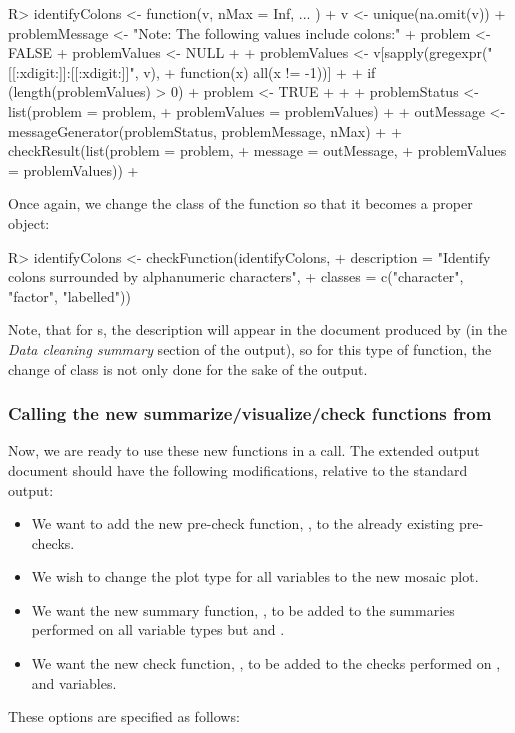 \documentclass[article,shortnames]{jss}
\begin{document}
\begin{Schunk}
\begin{Sinput}
R> identifyColons <- function(v, nMax = Inf, ... ) {
+    v <- unique(na.omit(v))
+    problemMessage <- "Note: The following values include colons:"
+    problem <- FALSE
+    problemValues <- NULL
+  
+    problemValues <- v[sapply(gregexpr("[[:xdigit:]]:[[:xdigit:]]", v),
+      function(x) all(x != -1))]
+  
+    if (length(problemValues) > 0) {
+      problem <- TRUE
+    }
+  
+    problemStatus <- list(problem = problem,
+      problemValues = problemValues)
+  
+    outMessage <- messageGenerator(problemStatus, problemMessage, nMax)
+  
+    checkResult(list(problem = problem,
+      message = outMessage,
+      problemValues = problemValues))
+  }
\end{Sinput}
\end{Schunk}

Once again, we change the class of the function so that it becomes a
proper  object:

\begin{Schunk}
\begin{Sinput}
R> identifyColons <- checkFunction(identifyColons,
+    description = "Identify colons surrounded by alphanumeric characters",
+    classes = c("character", "factor", "labelled"))
\end{Sinput}
\end{Schunk}

Note, that for s, the description will appear in
the document produced by  (in the \textit{Data cleaning
  summary} section of the output), so for this type of function, the
change of class is not only done for the sake of the
 output.

\subsubsection[Calling the new summarize/visualize/check functions from clean()]{Calling the new summarize/visualize/check functions from }
Now, we are ready to use these new functions in a 
call. The extended  output document should have the
following modifications, relative to the standard  output:
\begin{itemize}
\item We want to add the new pre-check function, , to the already existing pre-checks.
\item We wish to change the plot type for all variables to the new mosaic plot.
\item We want the new summary function, , to be added to the summaries performed on all variable types but  and .
\item We want the new check function, , to be added to the checks performed on ,  and  variables.
\end{itemize}
These options are specified as follows:
\end{document}
